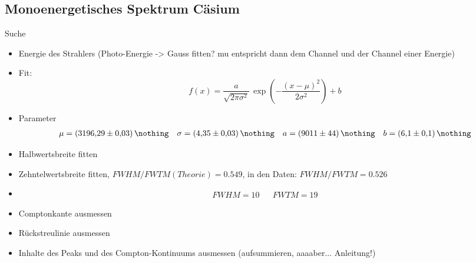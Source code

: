 \FloatBarrier
\subsection{Monoenergetisches Spektrum Cäsium}
Suche
\begin{itemize}
	\item Energie des Strahlers (Photo-Energie -> Gauss fitten? mu entspricht dann dem Channel und der Channel einer Energie)
	\item Fit:
	\begin{equation*}
		f(x) = \frac{a}{\sqrt{2 \pi \sigma^2}} \, \exp{\left( - \frac{(x-\mu)^2}{2 \sigma^2} \right)} + b
	\end{equation*}
	\item Parameter
	\begin{align*}
		\mu = \SI{3196.29 (3)}{\nothing} && \sigma = \SI{4.35 (3)}{\nothing} && a = \SI{9011 (44)}{\nothing} && b = \SI{6.1 (1)}{\nothing}
	\end{align*}
	\item Halbwertsbreite fitten
	\item Zehntelwertsbreite fitten, $FWHM/FWTM(Theorie) = 0.549$, in den Daten: $FWHM/FWTM = 0.526$
	\item
	\begin{align*}
		FWHM = 10 && FWTM = 19
	\end{align*}
	\item Comptonkante ausmessen
	\item Rückstreulinie ausmessen
	\item Inhalte des Peaks und des Compton-Kontinuums ausmessen (aufsummieren, aaaaber... Anleitung!)
\end{itemize}
